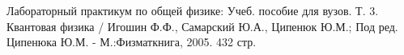 \documentclass[14pt,a4paper]{scrartcl}
\begin{document}

\newpage

\begin{thebibliography}{}

Лабораторный практикум по общей физике: Учеб. пособие для вузов. Т. 3. Квантовая физика / Игошин Ф.Ф., Самарский Ю.А., Ципенюк Ю.М.; Под ред. Ципенюка Ю.М. - М.:Физматкнига, 2005. 432 стр.



	
\end{thebibliography}
\end{document}
